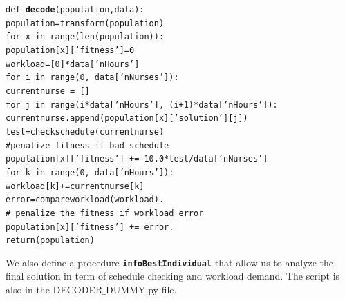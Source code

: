 \documentclass[11pt]{article}
\begin{document}
\begin{appendix}
\noindent
{\tt def {\bf decode}(population,data):\\
\noindent
\hspace*{1cm}   population=transform(population)\\
\noindent
\hspace*{1cm}    for x in range(len(population)):\\
\hspace*{1.5cm}        population[x]['fitness']=0\\
\hspace*{1.5cm}         workload=[0]*data['nHours']\\
\hspace*{1.5cm}         for i in range(0, data['nNurses']):\\
\hspace*{2cm}             currentnurse = []\\
\hspace*{2cm}             for j in range(i*data['nHours'], (i+1)*data['nHours']):\\
\hspace*{2.5cm}                 currentnurse.append(population[x]['solution'][j])\\
\hspace*{2cm}             test=checkschedule(currentnurse)\\
\hspace*{2cm}             \#penalize fitness if bad schedule\\
\hspace*{2cm}             population[x]['fitness'] += 10.0*test/data['nNurses']   \\
\hspace*{2cm}             for k in range(0, data['nHours']):\\
 \hspace*{2.5cm}                workload[k]+=currentnurse[k]\\
  \hspace*{1.5cm}        error=compareworkload(workload).  \\
  \hspace*{1.5cm}               \# penalize the fitness if workload error\\
 \hspace*{1.5cm}        population[x]['fitness'] +=  error. \\
    return(population)\\
}

We also define a procedure {\tt \bf infoBestIndividual} that allow us to analyze the final solution in term of schedule checking and workload demand. The script is also  in the 
DECODER$\_$DUMMY.py file.



\end{appendix}
\end{document}
